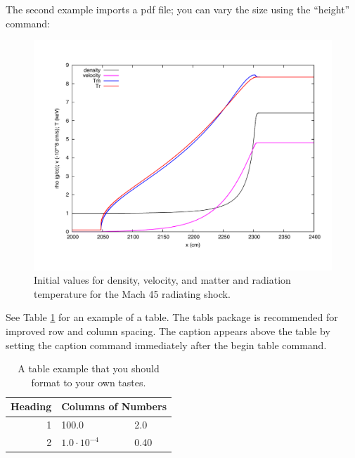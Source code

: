 \documentclass{ictt25}
\begin{document}
The second example imports a pdf file; you can vary
the size using the ``height'' command:
%
\begin{figure}[!htb]
\begin{center}
\includegraphics[height=0.3\textheight]{Mach45ICs.pdf}
\begin{spacing}{1.0}
\vspace{-15pt}
\caption{Initial values for density, velocity, and matter
  and radiation temperature for the Mach 45 radiating shock.}
\label{fig:ICs}
\end{spacing}
\end{center}
\end{figure}
%

See Table \ref{tbl:example-table} for an example of a table.  The tabls package is
recommended for improved row and column spacing.  The caption appears 
above the table by setting the caption command immediately after 
the begin table command.
%
\begin{table}[!htb]
\caption{A table example that you should format to your own tastes.%
\label{tbl:example-table}} 
\begin{center}
\begin{tabular}{r|ll} \hline 
 Heading  & \multicolumn{2}{c}{Columns of Numbers} \\ \hline \hline
\ 1 &  100.0 & 2.0  \\ \hline
\ 2 &  $1.0 \cdot 10^{-4}$  & 0.40 \\ \hline 
\end{tabular}
\end{center}
\end{table}
\end{document}
